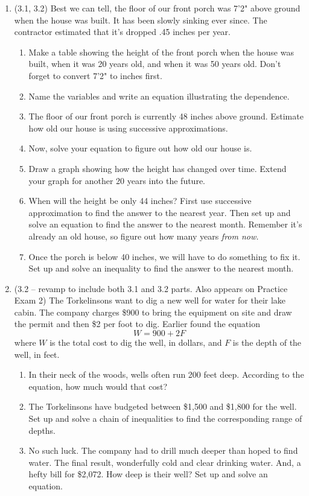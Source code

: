 \documentclass[12pt]{article}
\begin{document}
\begin{enumerate}
 \item  (3.1, 3.2)  Best we can tell, the floor of our front porch was 7'2" above ground when the house was built.  It has been slowly sinking ever since.  The contractor estimated that it's dropped .45 inches per year.
\begin{enumerate}
\item Make a table showing the height of the front porch when the house was built, when it was 20 years old, and when it was 50 years old.  Don't forget to convert 7'2" to inches first.
\item Name the variables and write an equation illustrating the dependence.
\item The floor of our front porch is currently 48 inches above ground.   Estimate how old our house is using successive approximations.
\item Now, solve your equation to figure out how old our house is.  
 \item Draw a graph showing how the height has changed over time.  Extend your graph for another 20 years into the future.
\item When will the height be only 44 inches?  First use successive approximation to find the answer to the nearest year.  Then set up and solve an equation to find the answer to the nearest month.  Remember it's already an old house, so figure out how many years \emph{from now.}
\item Once the porch is below 40 inches, we will have to do something to fix it. Set up and solve an inequality to find the answer to the nearest month.  
\end{enumerate} 

\item (3.2 -- revamp to include both 3.1 and 3.2 parts.  Also appears on Practice Exam 2) The Torkelinsons want to dig a new well for water for their lake cabin.  The company charges \$900 to bring the equipment on site and draw the permit and then \$2 per foot to dig.  Earlier found the equation $$W = 900 + 2F$$ where $W$ is the total cost to dig the well, in dollars, and $F$ is the depth of the well, in feet.
\begin{enumerate}
\item In their neck of the woods, wells often run 200 feet deep.  According to the equation, how much would that cost?
\item The Torkelinsons have budgeted between \$1,500 and \$1,800 for the well.  Set up and solve a chain of inequalities to find the corresponding range of depths.
\item No such luck.  The company had to drill much deeper than hoped to find water.  The final result, wonderfully cold and clear drinking water.  And, a hefty bill for \$2,072.  How deep is their well?  Set up and solve an equation.
\end{enumerate} 


\end{enumerate}
\end{document}
